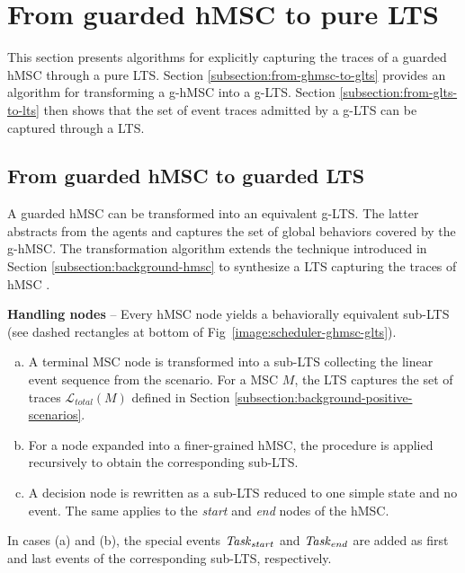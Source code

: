 \section{From guarded hMSC to pure LTS\label{section:deductive-glts-to-lts}}

This section presents algorithms for explicitly capturing the traces of a guarded hMSC through a pure LTS. Section \ref{subsection:from-ghmsc-to-glts} provides an algorithm for transforming a g-hMSC into a g-LTS. Section \ref{subsection:from-glts-to-lts} then shows that the set of event traces admitted by a g-LTS can be captured through a LTS.

\subsection{From guarded hMSC to guarded LTS\label{subsection:from-ghmsc-to-glts}}

A guarded hMSC can be transformed into an equivalent g-LTS. The latter abstracts from the agents and captures the set of global behaviors covered by the g-hMSC. The transformation algorithm extends the technique introduced in Section \ref{subsection:background-hmsc} to synthesize a LTS capturing the traces of hMSC \cite{Uchitel:2004}. 

\noindent \textbf{Handling nodes} -- Every hMSC node yields a behaviorally equivalent sub-LTS (see dashed rectangles at bottom of Fig~\ref{image:scheduler-ghmsc-glts}).
\begin{enumerate}[(a)]
\item A terminal MSC node is transformed into a sub-LTS collecting the linear event sequence from the scenario. For a MSC $M$, the LTS captures the set of traces $\mathcal{L}_{total}(M)$ defined in Section \ref{subsection:background-positive-scenarios}.
\item For a node expanded into a finer-grained hMSC, the procedure is applied recursively to obtain the corresponding sub-LTS.
\item A decision node is rewritten as a sub-LTS reduced to one simple state and no event. The same applies to the \emph{start} and \emph{end} nodes of the hMSC.
\end{enumerate}

In cases (a) and (b), the special events $\mbox{\emph{Task}}_{start}$ and $\mbox{\emph{Task}}_{end}$ are added as first and last events of the corresponding sub-LTS, respectively.

